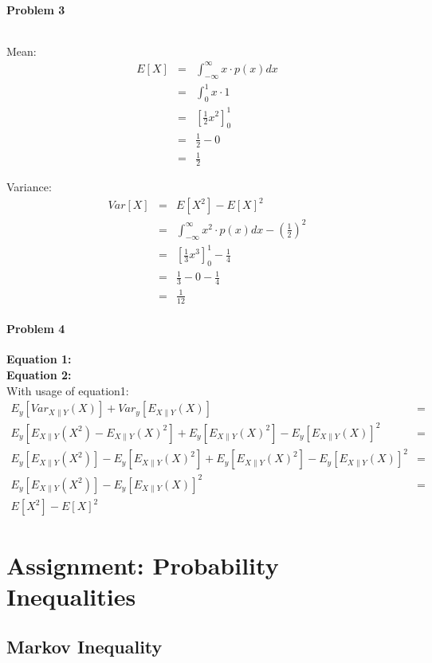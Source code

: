 \documentclass{article}
\begin{document}
\paragraph*{Problem 3}
$\;$ 

Mean:
\begin{eqnarray}
E[X] &=& \int_{-\infty}^{\infty}x \cdot p(x) dx\\
&=& \int_0^1 x \cdot 1\\
&=& \left[ \frac{1}{2} x^2\right] _0^1\\
&=& \frac{1}{2} - 0\\
&=& \frac{1}{2}
\end{eqnarray}

Variance:
\begin{eqnarray}
Var[X] &=& E[X^2] - E[X]^2\\
&=& \int_{-\infty}^{\infty}x^2 \cdot p(x) dx - \left(\frac{1}{2}\right)^2\\
&=& \left[\frac{1}{3} x^3\right]_0^1 - \frac{1}{4}\\
&=& \frac{1}{3} - 0 - \frac{1}{4}\\
&=& \frac{1}{12}
\end{eqnarray}

\paragraph*{Problem 4}
$\;$ 
\\
\textbf{Equation 1:}
\\
\textbf{Equation 2:}
\\
With usage of equation1: 
\begin{eqnarray}
E_y[Var_{X\|Y}(X)] + Var_y[E_{X\|Y}(X)] &=& \\
E_y[E_{X\|Y}(X^2) - E_{X\|Y}(X)^2] + E_y[E_{X\|Y}(X)^2] - E_y[E_{X\|Y}(X)]^2  &=& \\
E_y[E_{X\|Y}(X^2)] - E_y[E_{X\|Y}(X)^2] + E_y[E_{X\|Y}(X)^2] - E_y[E_{X\|Y}(X)]^2  &=& \\
E_y[E_{X\|Y}(X^2)] - E_y[E_{X\|Y}(X)]^2  &=& \\
E[X^2] - E[X]^2
\end{eqnarray}

\section{Assignment: Probability Inequalities}
\subsection{Markov Inequality}
\end{document}
